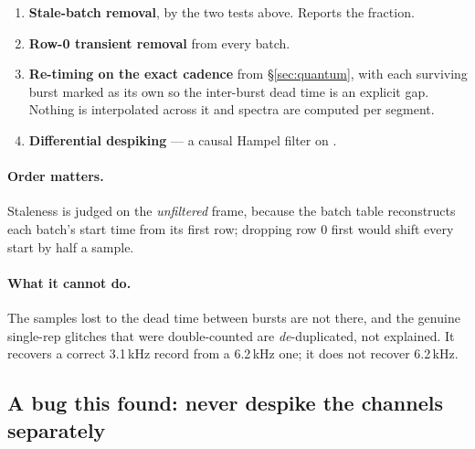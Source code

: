 \begin{enumerate}
  \item \textbf{Stale-batch removal}, by the two tests above. Reports the fraction.
  \item \textbf{Row-0 transient removal} from every batch.
  \item \textbf{Re-timing on the exact cadence} from \S\ref{sec:quantum}, with each
        surviving burst marked as its own  so the inter-burst dead time
        is an explicit gap. Nothing is interpolated across it and spectra are
        computed per segment.
  \item \textbf{Differential despiking} --- a causal Hampel filter on
        .
\end{enumerate}

\paragraph{Order matters.} Staleness is judged on the \emph{unfiltered} frame,
because the batch table reconstructs each batch's start time from its first row;
dropping row 0 first would shift every start by half a sample.

\paragraph{What it cannot do.} The samples lost to the dead time between bursts are
not there, and the genuine single-rep glitches that were double-counted are
\emph{de}-duplicated, not explained. It recovers a correct 3.1\,kHz record from a
6.2\,kHz one; it does not recover 6.2\,kHz.

\subsection{A bug this found: never despike the channels separately}
\label{sec:despikebug}

